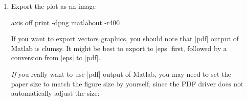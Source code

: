 {{\begin{enumerate}
\begin{codeexample}
h = datacursormode(gcf);
set(h,'UpdateFcn',@myupdatefcn,'SnapToDataVertex','off');
datacursormode on


function [txt] = myupdatefcn(obj,event_obj)

dpi = get(0,'ScreenPixelsPerInch');

screen_location=get(0,'PointerLocation');

figurePos = get(gcf,'Position');

pos = get(event_obj,'Position');

display(['(',num2str(pos(1)),',',num2str(pos(2)),',',num2str(pos(3)),') => (', ...
   num2str((screen_location(1)-figurePos(1))*72.27/dpi),',', ...
   num2str((screen_location(2)-figurePos(2))*72.27/dpi),')'])

txt = {['X: ',num2str(pos(1))],['Y: ',num2str(pos(2))],['Z: ',num2str(pos(3))]};
\end{codeexample}
	
	Run |pgfplotscsconversion|, click on four points in your plot. Preferably select non-colinear points near the edges of the plot. Copy and paste the four lines that were written to the Matlab command window.

	Make sure that the first two points have different $X$ and $Y$ values on screen (i.e.\ image canvas coordinates).
	\item Export the plot as an image
\begin{codeexample}
axis off
print -dpng matlabout -r400 %
\end{codeexample}

If you want to export vectors graphics, you should note that |pdf| output of Matlab is clumsy. It might be best to export to |eps| first, followed by a conversion from |eps| to |pdf|.

\emph{If} you really want to use |pdf| output of Matlab, you may need to set the paper size to match the figure size by yourself, since the PDF driver does not automatically adjust the size:


\end{enumerate}}}
